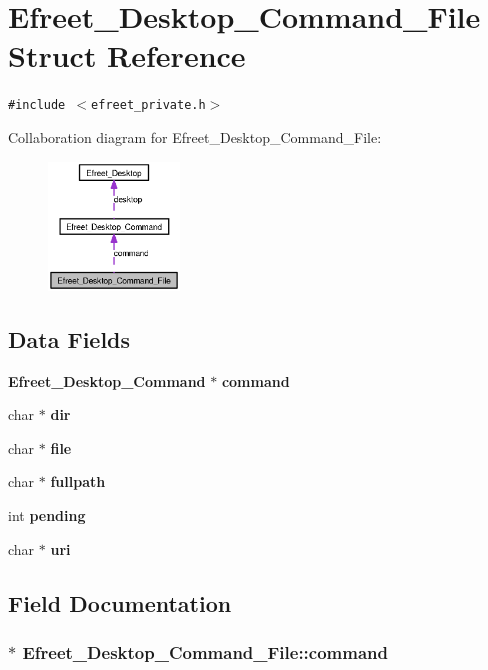 \section{Efreet\_\-Desktop\_\-Command\_\-File Struct Reference}
\label{structEfreet__Desktop__Command__File}
{\tt \#include $<$efreet\_\-private.h$>$}

Collaboration diagram for Efreet\_\-Desktop\_\-Command\_\-File:\nopagebreak
\begin{figure}[H]
\begin{center}
\leavevmode
\includegraphics[width=99pt]{structEfreet__Desktop__Command__File__coll__graph}
\end{center}
\end{figure}
\subsection*{Data Fields}
\begin{CompactItemize}
\item 
{\bf Efreet\_\-Desktop\_\-Command} $\ast$ {\bf command}
\item 
char $\ast$ {\bf dir}
\item 
char $\ast$ {\bf file}
\item 
char $\ast$ {\bf fullpath}
\item 
int {\bf pending}
\item 
char $\ast$ {\bf uri}
\end{CompactItemize}


\subsection{Field Documentation}
\subsubsection{$\ast$ {\bf Efreet\_\-Desktop\_\-Command\_\-File::command}}\label{structEfreet__Desktop__Command__File_4ff63f4f95696913101a58860e1b2b51}


